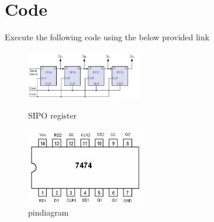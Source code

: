 \documentclass{article}
\begin{document}
\section{Code}
Execute the following code using the below provided link
\\
\begin{table}[ht]
\end{table}
\begin{figure}[ht]
\centering
\begin{minipage}[b]{.49\textwidth}
\includegraphics[width=2in]{SIPOregister.png}
\caption{SIPO register}
\label{fig:SIPO}
\end{minipage}
\begin{minipage}[b]{.49\textwidth}
\includegraphics[width=2in]{pindiagram.png}
\caption{pindiagram}
\label{fig:7474}
\end{minipage}
\end{figure}
\end{document}
